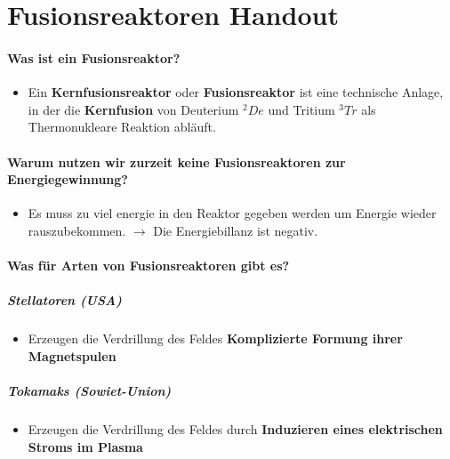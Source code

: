 \documentclass[a4paper,12pt]{scrartcl}
\begin{document}

%
%

\section*{Fusionsreaktoren Handout}

\paragraph{Was ist ein Fusionsreaktor?}

\begin{itemize}
  \item Ein \textbf{Kernfusionsreaktor} oder \textbf{Fusionsreaktor} ist eine
  technische Anlage, in der die \textbf{Kernfusion} von Deuterium \( {}^{2}De \)
   und Tritium \( {}^{3}Tr \) als Thermonukleare Reaktion abläuft.
\end{itemize}

\paragraph{Warum nutzen wir zurzeit keine Fusionsreaktoren zur Energiegewinnung?}

\begin{itemize}
  \item Es muss zu viel energie in den Reaktor gegeben werden um Energie wieder
  rauszubekommen. \( \rightarrow \) Die Energiebillanz ist negativ.
\end{itemize}

\paragraph{Was für Arten von Fusionsreaktoren gibt es?}

\subparagraph{Stellatoren (USA)}
\begin{itemize}
  \item Erzeugen die Verdrillung des Feldes \textbf{ Komplizierte Formung ihrer
  Magnetspulen }
\end{itemize}

\subparagraph{Tokamaks (Sowiet-Union)}
\begin{itemize}
  \item Erzeugen die Verdrillung des Feldes durch \textbf{ Induzieren eines
  elektrischen Stroms im Plasma }

\end{itemize}
\end{document}
